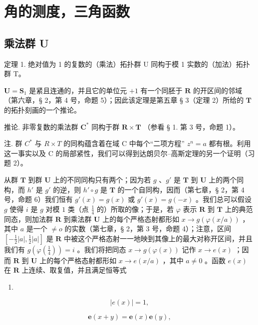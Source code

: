 \section{角的测度，三角函数}

\subsection{乘法群 U}

定理 1. 绝对值为 1 的复数的（乘法）拓扑群 U 同构于模 1 实数的（加法）拓扑群 T。

\(\mathbf{U} = \mathbf{S}_{1}\) 是紧且连通的，并且它的单位元 \(+1\) 有一个同胚于 \(\mathbf{R}\) 的开区间的邻域（第六章，§ 2，第 4 号，命题 5）；因此该定理是第五章 § 3（定理 2）所给的 \(\mathbf{T}\) 的拓扑刻画的一个推论。

推论. 非零复数的乘法群 \(\mathbf{C}^*\) 同构于群 \(\mathbf{R} \times \mathbf{T}\) （参看 § 1. 第 3 号，命题 1）。

注. 群 \(C^{*}\) 与 \(R \times T\) 的同构蕴含着在域 C 中每个“二项方程” \(z^{n} = a\) 都有根。利用这一事实以及 C 的局部紧性，我们可以得到达朗贝尔–高斯定理的另一个证明（习题 2）。

从群 \(\mathbf{T}\) 到群 \(\mathbf{U}\) 上的不同同构只有两个；因为若 \(g\) 、\(g'\) 是 \(\mathbf{T}\) 到 \(\mathbf{U}\) 上的两个同构，而 \(h'\) 是 \(g'\) 的逆，则 \(h' \circ g\) 是 \(\mathbf{T}\) 的一个自同构，因而（第七章，§ 2，第 4 号，命题 6）我们恒有 \(g'(x) = g(x)\) 或 \(g'(x) = g(-x)\) 。我们总可以假设 \(g\) 使得 \(i\) 是 \(g\) 对模 \(1\) 类（点 \(\frac{1}{4}\) 的）所取的像；于是，若 \(\varphi\) 表示 \(\mathbf{R}\) 到 \(\mathbf{T}\) 上的典范同态，则加法群 \(\mathbf{R}\) 到乘法群 \(\mathbf{U}\) 上的每个严格态射都形如 \(x \to g(\varphi(x/a))\) ，其中 \(a\) 是一个 \(\neq o\) 的实数（第七章，§ 2，第 3 号，命题 4）；注意，区间 \([- \frac{1}{2} |a|, \frac{1}{2} |a|]\) 是 \(\mathbf{R}\) 中被这个严格态射一一地映到其像上的最大对称开区间，并且我们有 \(g(\varphi(\frac{1}{4})) = i\) 。我们将把同态 \(x \to g(\varphi(x))\) 记作 \(x \to e(x)\) ；因而 \(\mathbf{R}\) 到 \(\mathbf{U}\) 上的每个严格态射都形如 \(x \to e(x/a)\) ，其中 \(a \neq 0\) 。函数 \(e(x)\) 在 \(\mathbf{R}\) 上连续、取复值，并且满足恒等式

\begin{enumerate}
\def\labelenumi{(\arabic{enumi})}
\tightlist
\item
\end{enumerate}

\[
\left| e (x) \right| = 1,\tag{2}
\]

\[
\boldsymbol {e} (x + y) = \boldsymbol {e} (x) \boldsymbol {e} (y),
\]

